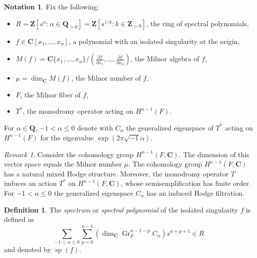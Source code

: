 \documentclass{amsart}
\newcommand{\C}{\mathbf{C}}
\newcommand{\Q}{\mathbf{Q}}
\newcommand{\Z}{\mathbf{Z}}
\theoremstyle{definition}
\newtheorem{notation}[lemma]{Notation}
\newtheorem{definition}[lemma]{Definition}
\theoremstyle{remark}
\newtheorem{remark}[lemma]{Remark}
\DeclareMathOperator{\Gr}{Gr}
\DeclareMathOperator{\spe}{sp}
\begin{document}
\begin{notation} Fix the following:
\begin{itemize}
\item $R= \Z[s^{\alpha}\colon \alpha \in \Q_{>0}]=\Z[s^{1/k}\colon k\in \Z_{>0}] $, the ring of spectral polynomials,
\item $f\in \C[x_1,\dots,x_n]$,  a polynomial with an isolated singularity at the origin,
\item $M(f)= \C\{x_1,\dots,x_n\}/(\frac{\partial f}{\partial x_1},\dots,\frac{\partial f}{\partial x_n})$, the Milnor algebra of $f$,
\item $\mu=\dim_{\C} M(f)$, the Milnor number of $f$,
\item $F$, the Milnor fiber of $f$,
\item $T^*$, the monodromy operator acting on $H^{n-1}(F)$.
\end{itemize}
For $\alpha \in \Q$, $-1<\alpha\leq 0$ denote with $C_{\alpha}$ the generalized eigenspace of $T^*$ acting on $H^{n-1}(F)$ for the eigenvalue $\exp(2\pi \sqrt{-1} \alpha)$. 
\end{notation}

\begin{remark}
 Consider the cohomology group  $H^{n-1}(F,\C)$. The dimension of this vector space equals the Milnor number $\mu$. 
The cohomology group $H^{n-1}(F,\C)$ has a natural mixed Hodge structure. Moreover, the monodromy operator $T$ induces an action $T^*$ on $H^{n-1}(F,\C)$, whose semisemplification has finite order. For $-1<\alpha\leq 0$ the generalized eigenspace  $C_{\alpha}$ has an induced  Hodge filtration.
\end{remark}
\begin{definition}
The \emph{spectrum} or \emph{spectral polynomial} of the isolated singularity $f$ is defined as 
\[ \sum_{-1<\alpha\leq 0}\sum_{p=0}^{n-1} \left(\dim_{\C} \Gr_F^{n-1-p} C_{\alpha}\right) s^{\alpha+p+1}\in R \]
and denoted by $\spe(f)$.
\end{definition}
\end{document}
